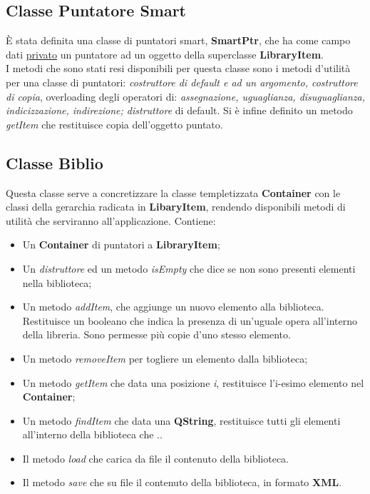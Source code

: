 {		\subsection{Classe Puntatore Smart}{
			È stata definita una classe di puntatori smart, \textbf{SmartPtr}, che ha come campo dati \underline{privato} un puntatore ad un oggetto della superclasse \textbf{LibraryItem}. \\
			I metodi che sono stati resi disponibili per questa classe sono i metodi d'utilità per una classe di puntatori:
			\textit{costruttore di default e ad un argomento, costruttore di copia}, overloading degli operatori di: \textit{assegnazione, uguaglianza, disuguaglianza, indicizzazione, indirezione; distruttore} di default. Si è infine definito un metodo \textit{getItem} che restituisce copia dell'oggetto puntato.
		}
		\subsection{Classe Biblio}{
			Questa classe serve a concretizzare la classe templetizzata \textbf{Container} con le classi della gerarchia radicata in \textbf{LibaryItem}, rendendo disponibili metodi di utilità che serviranno all'applicazione. Contiene:
			\begin{itemize}\itemsep=0.5pt
				\item Un \textbf{Container} di puntatori a \textbf{LibraryItem};
				\item Un \textit{distruttore} ed un metodo \textit{isEmpty} che dice se non sono presenti elementi nella biblioteca;
				\item Un  metodo \textit{addItem}, che aggiunge un nuovo elemento alla biblioteca. Restituisce un booleano che indica la presenza di un'uguale opera all'interno della libreria. Sono permesse più copie d'uno stesso elemento.
				\item Un metodo \textit{removeItem} per togliere un elemento dalla biblioteca;
				\item Un metodo \textit{getItem} che data una posizione \textit{i}, restituisce l'i-esimo elemento nel \textbf{Container};
				\item Un metodo \textit{findItem} che data una \textbf{QString}, restituisce tutti gli elementi all'interno della biblioteca che ..
				\item Il metodo \textit{load} che carica da file il contenuto della biblioteca.
				\item Il metodo \textit{save} che su file il contenuto della biblioteca, in formato \textbf{XML}.
				
			\end{itemize}
		}
	}
